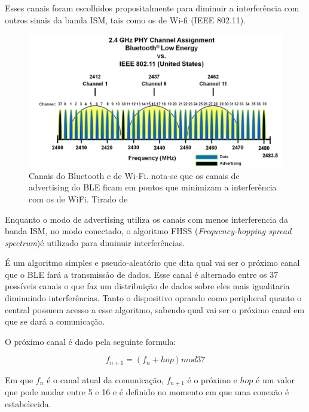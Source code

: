 \begin{itemize}
    Esses canais foram escolhidos propositalmente para diminuir a interferência com outros sinais da banda ISM, tais como os de Wi-fi (IEEE 802.11).

    \begin{figure}[H]
        \centering
        \includegraphics[width=1.0\textwidth]{images/ble-phy-channel-overlap.png}
        \caption{Canais do Bluetooth e de Wi-Fi. nota-se que os canais de advertising do BLE ficam em pontos que minimizam a interferência com os de WiFi. Tirado de \cite{Microchip_Site} }
        \label{fig:ble-phy-channel-overlap.png}
    \end{figure}
    
    
    Enquanto o modo de advertising utiliza os canais com menos interferencia da banda ISM, no modo conectado, o algoritmo FHSS (\textit{Frequency-hopping spread spectrum})é utilizado para diminuir interferências.

    É um algoritmo simples e pseudo-aleatório que dita qual vai ser o próximo canal que o BLE fará a transmissão de dados. Esse canal é alternado entre os 37 possíveis canais o que faz um distribuição de dados sobre eles mais igualitaria diminuindo interferências. Tanto o dispositivo oprando como peripheral quanto o central possuem acesso a esse algoritmo, sabendo qual vai ser o próximo canal em que se dará a comunicação.

    O próximo canal é dado pela seguinte formula:

    \begin{equation}
        f_{n+1} = (f_{n} + hop) mod 37
    \end{equation}

    Em que \( f_{n} \) é o canal atual da comunicação, \( f_{n + 1} \) é o próximo e \( hop \) é um valor que pode mudar entre 5 e 16 e é definido no momento em que uma conexão é estabelecida.


\end{itemize}

